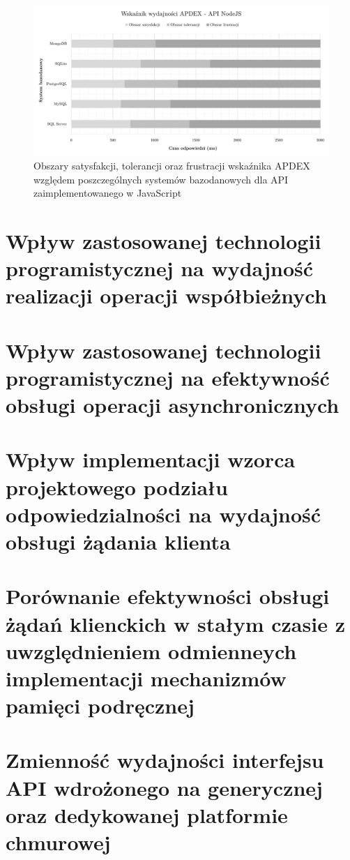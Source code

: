 \begin{figure}[ht]
    \centering
     \includegraphics[width=\linewidth]{rys05/apdex-nodejs.pdf}
    \caption{Obszary satysfakcji, tolerancji oraz frustracji wskaźnika APDEX względem poszczególnych systemów bazodanowych dla API zaimplementowanego w JavaScript}
    \label{fig:apdex-nodejs}
\end{figure}

\section{Wpływ zastosowanej technologii programistycznej na wydajność realizacji operacji współbieżnych}
\section{Wpływ zastosowanej technologii programistycznej na efektywność obsługi operacji asynchronicznych}
\section{Wpływ implementacji wzorca projektowego podziału odpowiedzialności na wydajność obsługi żądania klienta}
\section{Porównanie efektywności obsługi żądań klienckich w stałym czasie z uwzględnieniem odmienneych implementacji mechanizmów pamięci podręcznej}
\section{Zmienność wydajności interfejsu API wdrożonego na generycznej oraz dedykowanej platformie chmurowej}